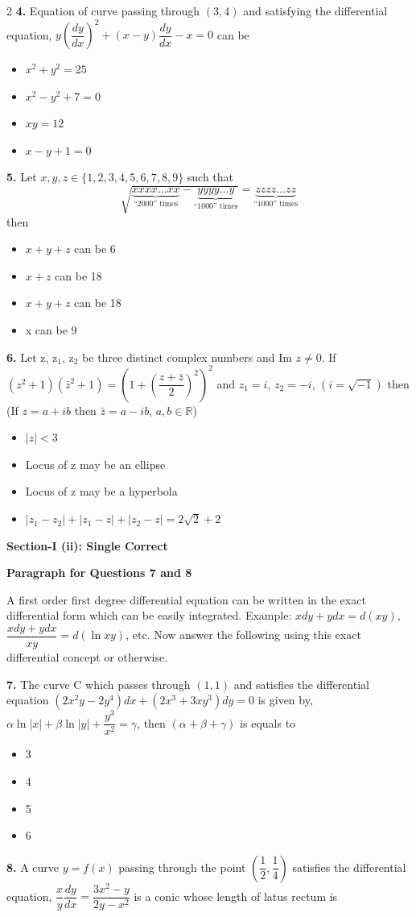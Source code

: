 \documentclass[10pt]{extarticle}
\newenvironment{qoptions}{\begin{itemize}[leftmargin=1.8em,itemsep=2pt,topsep=2pt,label={}]}{\end{itemize}}
\newcommand{\opt}[2]{\item[({#1})] {#2}}
\newcommand{\subsectionhdr}[1]{\par\vspace{3pt}\noindent\textbf{#1}\par\vspace{2pt}}
\begin{document}
\begin{multicols}{2}
\textbf{4.} Equation of curve passing through $(3,4)$ and satisfying the differential equation, $y\left(\dfrac{dy}{dx}\right)^2+(x-y)\dfrac{dy}{dx}-x=0$ can be

\begin{qoptions}
\opt{A}{$x^2+y^2=25$}
\opt{B}{$x^2-y^2+7=0$}
\opt{C}{$xy=12$}
\opt{D}{$x-y+1=0$}
\end{qoptions}

\textbf{5.} Let $x,y,z\in\{1,2,3,4,5,6,7,8,9\}$ such that
$$\sqrt{\underbrace{xxxx\ldots xx}_{\text{``2000'' times}}-\underbrace{yyyy\ldots y}_{\text{``1000'' times}}}=\underbrace{zzzz\ldots zz}_{\text{``1000'' times}}$$
then

\begin{qoptions}
\opt{A}{$x+y+z$ can be 6}
\opt{B}{$x+z$ can be 18}
\opt{C}{$x+y+z$ can be 18}
\opt{D}{x can be 9}
\end{qoptions}

\textbf{6.} Let z, z$_1$, z$_2$ be three distinct complex numbers and $\text{Im }z\ne0$. If $(z^2+1)(\bar z^2+1)=\left(1+\left(\dfrac{z+\bar z}2\right)^2\right)^2$ and $z_1=i$, $z_2=-i$, $(i=\sqrt{-1})$ then (If $z=a+ib$ then $\bar z=a-ib$, $a,b\in\mathbb R$)

\begin{qoptions}
\opt{A}{$|z|<3$}
\opt{B}{Locus of z may be an ellipse}
\opt{C}{Locus of z may be a hyperbola}
\opt{D}{$|z_1-z_2|+|z_1-z|+|z_2-z|=2\sqrt2+2$}
\end{qoptions}

\subsectionhdr{Section-I (ii): Single Correct}

\textbf{Paragraph for Questions 7 and 8}

A first order first degree differential equation can be written in the exact differential form which can be easily integrated. Example: $xdy+ydx=d(xy)$, $\dfrac{xdy+ydx}{xy}=d(\ln xy)$, etc. Now answer the following using this exact differential concept or otherwise.

\textbf{7.} The curve C which passes through $(1,1)$ and satisfies the differential equation $(2x^2y-2y^4)dx+(2x^3+3xy^3)dy=0$ is given by, $\alpha\ln|x|+\beta\ln|y|+\dfrac{y^3}{x^2}=\gamma$, then $(\alpha+\beta+\gamma)$ is equals to

\begin{qoptions}
\opt{A}{3}
\opt{B}{4}
\opt{C}{5}
\opt{D}{6}
\end{qoptions}

\textbf{8.} A curve $y=f(x)$ passing through the point $\left(\dfrac12,\dfrac14\right)$ satisfies the differential equation, $\dfrac xy\dfrac{dy}{dx}=\dfrac{3x^2-y}{2y-x^2}$ is a conic whose length of latus rectum is


\end{multicols}
\end{document}

